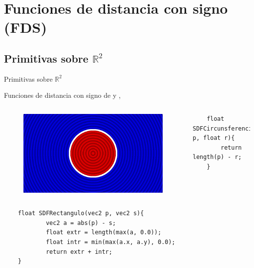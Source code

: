 \section{Funciones de distancia con signo (FDS)}

\SectionPage

\subsection{Primitivas sobre \(\mathbb{R}^2\)}
\begin{frame}[fragile]{Primitivas sobre \(\mathbb{R}^2\)}
    
    Funciones de distancia con signo de \cite{2ddistinigo} y \cite{3ddistinigo},
    
    \begin{columns}[c, onlytextwidth]
        \column{1.5in}
            \begin{figure}[H]
              \centering
              \includegraphics[width=1.0\textwidth]{imagenes/sdf/2d/sdf_circunsferencia.png}
            \end{figure}
        
        \column{\dimexpr\paperwidth-10pt}
        
            \begin{lstlisting}
    float SDFCircunsferencia(vec2 p, float r){
        return length(p) - r;
    }
            \end{lstlisting}
        
    \end{columns}
    
    \begin{columns}[c, onlytextwidth]
        \column{\dimexpr\paperwidth-140pt}
            \begin{lstlisting}
    float SDFRectangulo(vec2 p, vec2 s){
            vec2 a = abs(p) - s;
            float extr = length(max(a, 0.0));
            float intr = min(max(a.x, a.y), 0.0);
            return extr + intr;
    }
            \end{lstlisting}
    

\end{columns}
\end{frame}
